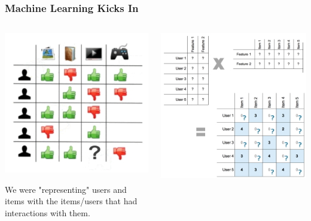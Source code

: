 \documentclass[11pt,aspectratio=169]{beamer}
\begin{document}
	\begin{frame}
		\frametitle{Machine Learning Kicks In}
		\begin{columns}
			\begin{column}{0.5\textwidth}
				\begin{center}
					\centering
					\includegraphics[width=\textwidth]{images/cf-stage2.png}
					
					We were "representing" users and items with the items/users that had interactions with them.
				\end{center}
			\end{column}\pause
			\begin{column}{0.5\textwidth}
				\begin{center}
					\centering
					\includegraphics[width=\textwidth]{images/matrix_factorization.png}
					

\end{center}
\end{column}
\end{columns}
\end{frame}
\end{document}
